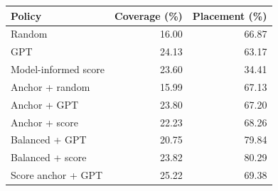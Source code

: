 \begin{tabular}{@{}lrr@{}}\toprule
Policy & Coverage (\%) & Placement (\%)\\\midrule
Random & 16.00 & 66.87 \\
GPT & 24.13 & 63.17 \\
Model-informed score & 23.60 & 34.41 \\
Anchor + random & 15.99 & 67.13 \\
Anchor + GPT & 23.80 & 67.20 \\
Anchor + score & 22.23 & 68.26 \\
Balanced + GPT & 20.75 & 79.84 \\
Balanced + score & 23.82 & 80.29 \\
Score anchor + GPT & 25.22 & 69.38 \\
\bottomrule\end{tabular}
